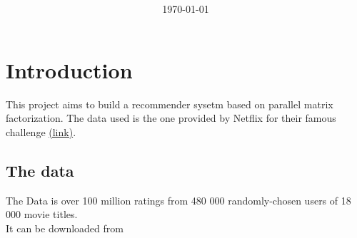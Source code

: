 \documentclass[10pt]{article}
\begin{document}
\title{\huge{}\\\large{}}
\author{\bfseries\large{}}
\date{\today}
\maketitle
\section{Introduction}
This project aims to build a recommender sysetm based on parallel matrix factorization. The data used is the one provided by Netflix for their famous challenge \href{http://www.netflixprize.com/}{(link)}.
\subsection{The data}
The Data is over 100 million ratings from 480 000
randomly-chosen users of 18 000 movie titles.\\
It can be downloaded from 
\end{document}
